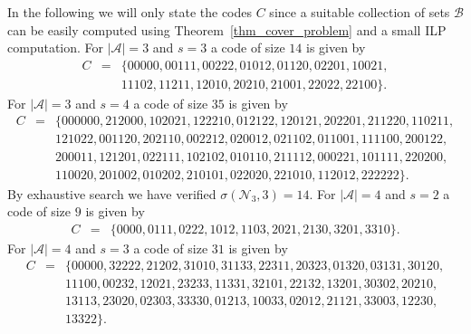 \documentclass[11pt]{article}
\newcommand{\cA}{\mathcal{A}}
\newcommand{\cN}{\mathcal{N}}
\begin{document}
In the following we will only state the codes $C$ since a suitable collection of sets $\mathcal{B}$ can be easily computed using Theorem~\ref{thm_cover_problem} and a small ILP 
computation. For $|\cA|=3$ and $s=3$ a code of size 
$14$ is given by 
\begin{eqnarray*}
  C&=&\{0 0 0 0 0,0 0 1 1 1,0 0 2 2 2,0 1 0 1 2, 0 1 1 2 0, 0 2 2 0 1, 1 0 0 2 1, \\ 
  && 1 1 1 0 2,1 1 2 1 1,1 2 0 1 0,2 0 2 1 0,2 1 0 0 1, 2 2 0 2 2,2 2 1 0 0\}.
\end{eqnarray*} 
For $|\cA|=3$ and $s=4$ a code of size $35$ is given by 
\begin{eqnarray*}
  C&=&\{0 0 0 0 0 0,2 1 2 0 0 0,1 0 2 0 2 1,1 2 2 2 1 0,0 1 2 1 2 2,1 2 0 1 2 1,2 0 2 2 0 1,2 1 1 2 2 0, 1 1 0 2 1 1,\\ 
  &&  1 2 1 0 2 2, 0 0 1 1 2 0, 2 0 2 1 1 0,0 0 2 2 1 2, 0 2 0 0 1 2,0 2 1 1 0 2,0 1 1 0 0 1, 1 1 1 1 0 0,2 0 0 1 2 2,\\ 
  &&  2 0 0 0 1 1, 1 2 1 2 0 1, 0 2 2 1 1 1, 1 0 2 1 0 2, 0 1 0 1 1 0, 2 1 1 1 1 2, 0 0 0 2 2 1, 1 0 1 1 1 1, 2 2 0 2 0 0, \\  
  &&  1 1 0 0 2 0, 2 0 1 0 0 2, 0 1 0 2 0 2, 2 1 0 1 0 1, 0 2 2 0 2 0, 2 2 1 0 1 0, 1 1 2 0 1 2, 2 2 2 2 2 2\}.
\end{eqnarray*}   
By exhaustive search we have verified $\sigma(\cN_3,3)=14$. For $|\cA|=4$ and $s=2$ a code of size $9$ is given by 
\begin{eqnarray*}
  C&=&\{0 0 0 0,0 1 1 1, 0 2 2 2,1 0 1 2,1 1 0 3,2 0 2 1,2 1 3 0,3 2 0 1,3 3 1 0\}.
\end{eqnarray*}   
For $|\cA|=4$ and $s=3$ a code of size $31$ is given by 
\begin{eqnarray*}
  C&=&\{00000, 32222, 21202, 31010, 31133, 22311, 20323, 01320, 03131, 30120, \\ 
  &&    11100, 00232, 12021, 23233, 11331, 32101, 22132, 13201, 30302, 20210, \\ 
  &&    13113, 23020, 02303, 33330, 01213, 10033, 02012, 21121, 33003, 12230, \\ 
  && 13322\}.
\end{eqnarray*}
\end{document}
